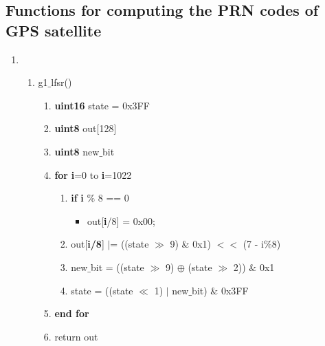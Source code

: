 \documentclass[journal,10pt,onecolumn]{article}
\begin{document}
\subsection{Functions for computing the PRN codes of GPS satellite}
\begin{enumerate}
    \item 
    \begin{enumerate}
    \item g1$\_$lfsr()
    \begin{enumerate}
    \item[] \textbf{uint16} state = 0x3FF
    \item[] \textbf{uint8} out[128]
    \item[] \textbf{uint8} new$\_$bit
    \item[] \textbf{for} \textbf{i}=0 to \textbf{i}=1022
        \begin{enumerate}
            \item[] \textbf{if} \textbf{i} $\%$ 8 == 0
            \begin{itemize}
                \item[] out[\textbf{i}/8] = 0x00; 
            \end{itemize}
            \item[] out[\textbf{i/8}] $|$= ((state $\gg$ 9) \& 0x1) $<<$ (7 - i$\%$8) 
            \item[] new$\_$bit = ((state $\gg$ 9) $\oplus$ (state $\gg$ 2)) $\&$ 0x1
            \item[] state = ((state $\ll$ 1) $\vert$  new$\_$bit) $\&$ 0x3FF
        \end{enumerate}
    \item[] \textbf{end for}
    \item[] return out
    \end{enumerate}
    
    


\end{enumerate}
\end{enumerate}
\end{document}
